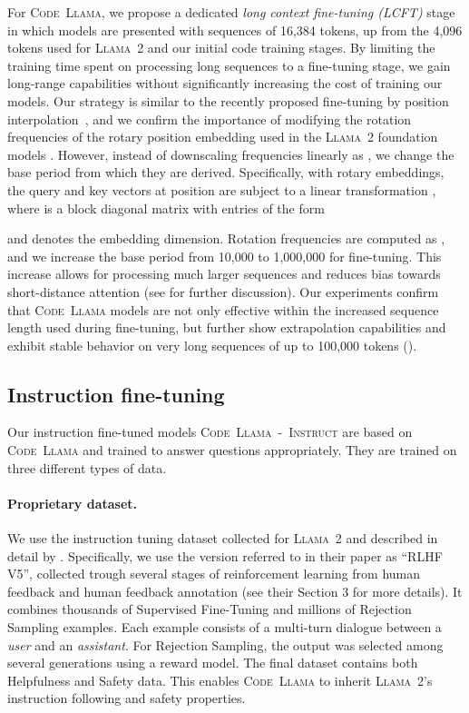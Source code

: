\documentclass[10pt]{article}
\newcommand{\model}{\textsc{Code~Llama}\xspace}
\newcommand{\instmodel}{\textsc{Code~Llama~-~Instruct}\xspace}
\newcommand{\llamavtwo}{\textsc{Llama~2}\xspace}
\begin{document}
For \model, we propose a dedicated \emph{long context fine-tuning (LCFT)} stage in which models are presented with sequences of 16,384 tokens, up from the 4,096 tokens used for \llamavtwo and our initial code training stages.
By limiting the training time spent on processing long sequences to a fine-tuning stage, we gain long-range capabilities without significantly increasing the cost of training our models.
Our strategy is similar to the recently proposed fine-tuning by position interpolation~\citep{chen2023extending},  and we confirm the importance of modifying the rotation frequencies of the rotary position embedding used in the \llamavtwo foundation models \citep{su2021roformer}.
However, instead of downscaling frequencies linearly as \citet{chen2023extending}, we change the base period from which they are derived.
Specifically, with rotary embeddings, the query and key vectors  at position  are subject to a linear transformation , where  is a block diagonal matrix with entries of the form

and  denotes the embedding dimension.
Rotation frequencies are computed as , and we increase the base period  from 10,000 to 1,000,000 for fine-tuning.
This increase allows for processing much larger sequences and reduces bias towards short-distance attention (see  for further discussion).
Our experiments confirm that \model models are not only effective within the increased sequence length used during fine-tuning, but further show extrapolation capabilities and exhibit stable behavior on very long sequences of up to 100,000 tokens (). 
\subsection{Instruction fine-tuning}
\label{sec:instruct}

Our instruction fine-tuned models \instmodel are based on \model and trained to answer questions appropriately. They are trained on three different types of data.

\paragraph{Proprietary dataset.}
We use the instruction tuning dataset collected for \llamavtwo and described in detail by \citet{touvron2023llamav2}. Specifically, we use the version referred to in their paper as ``RLHF V5'',  collected trough several stages of reinforcement learning from human feedback and human feedback annotation  (see their Section 3 for more details). It combines thousands of Supervised Fine-Tuning and millions of Rejection Sampling examples. Each example consists of a multi-turn  dialogue between a \emph{user} and an \emph{assistant}. For Rejection Sampling, the output was selected among several generations using a reward model. The final dataset contains both Helpfulness and Safety data. This enables \model to inherit \llamavtwo's instruction following and safety properties.
\end{document}
